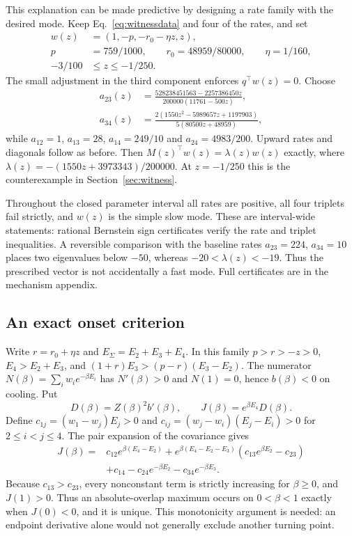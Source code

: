 \documentclass[11pt]{article}
\begin{document}
This explanation can be made predictive by designing a rate family with
the desired mode. Keep Eq.~\eqref{eq:witnessdata} and four of the rates,
and set
\begin{align}
 w(z)&=(1,-p,-r_0-\eta z,z),\label{eq:family}\\
 p&=759/1000,\qquad r_0=48959/80000,\qquad \eta=1/160,\nonumber\\
 -3/100&\leq z\leq-1/250.\nonumber
\end{align}
The small adjustment in the third component enforces $q^\top w(z)=0$.
Choose
\begin{align}
 a_{23}(z)&=\frac{528238451563-2257386450z}
                    {200000(11761-500z)},\label{eq:familyrates}\\
 a_{34}(z)&=\frac{2(1550z^2-5989657z+1197903)}
                    {5(80500z+48959)},\nonumber
\end{align}
while $a_{12}=1$, $a_{13}=28$, $a_{14}=249/10$ and
$a_{24}=4983/200$. Upward rates and diagonals follow as before.
Then $M(z)^\top w(z)=\lambda(z)w(z)$ exactly, where
$\lambda(z)=-(1550z+3973343)/200000$.
At $z=-1/250$ this is the counterexample in Section~\ref{sec:witness}.

Throughout the closed parameter interval all rates are positive, all
four triplets fail strictly, and $w(z)$ is the simple slow mode. These
are interval-wide statements: rational Bernstein sign certificates verify
the rate and triplet inequalities. A reversible comparison with the
baseline rates $a_{23}=224$, $a_{34}=10$ places two eigenvalues below
$-50$, whereas $-20<\lambda(z)<-19$. Thus the prescribed vector is not
accidentally a fast mode. Full certificates are in the mechanism appendix.

\subsection{An exact onset criterion}
Write $r=r_0+\eta z$ and $E_\Sigma=E_2+E_3+E_4$. In this family
$p>r>-z>0$, $E_4>E_2+E_3$, and
$(1+r)E_3>(p-r)(E_3-E_2)$. The numerator
$N(\beta)=\sum_iw_i e^{-\beta E_i}$ has $N'(\beta)>0$ and
$N(1)=0$, hence $b(\beta)<0$ on cooling. Put
\[
 D(\beta)=Z(\beta)^2b'(\beta),\qquad
 J(\beta)=e^{\beta E_4}D(\beta).
\]
Define $c_{1j}=(w_1-w_j)E_j>0$ and
$c_{ij}=(w_j-w_i)(E_j-E_i)>0$ for $2\leq i<j\leq4$.
The pair expansion of the covariance gives
\begin{align}
 J(\beta)={}&c_{12}e^{\beta(E_4-E_2)}
 +e^{\beta(E_4-E_2-E_3)}(c_{13}e^{\beta E_2}-c_{23})\nonumber\\
 &+c_{14}-c_{24}e^{-\beta E_2}-c_{34}e^{-\beta E_3}.\label{eq:monotoneJ}
\end{align}
Because $c_{13}>c_{23}$, every nonconstant term is strictly increasing
for $\beta\geq0$, and $J(1)>0$. Thus an absolute-overlap maximum occurs
on $0<\beta<1$ exactly when $J(0)<0$, and it is unique.
This monotonicity argument is needed: an endpoint derivative alone would
not generally exclude another turning point.
\end{document}
